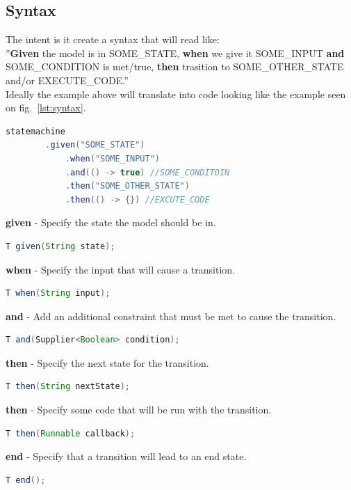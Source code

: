 \documentclass{article}
\begin{document}
\subsection{Syntax}

The intent is it create a syntax that will read like:\\
''\textbf{Given} the model is in SOME\_STATE, \textbf{when} we give it SOME\_INPUT \textbf{and} SOME\_CONDITION is met/true, \textbf{then} trasition to SOME\_OTHER\_STATE  and/or EXECUTE\_CODE.''\\

\noindent Ideally the example above will translate into code looking like the example seen on fig.~\ref{lst:syntax}.
\begin{lstlisting}[language=java, caption={Example of Intented API Usage}, captionpos=b, label={lst:syntax}]
    statemachine
        .given("SOME_STATE")
            .when("SOME_INPUT")
            .and(() -> true) //SOME_CONDITOIN
            .then("SOME_OTHER_STATE")
            .then(() -> {}) //EXCUTE_CODE
\end{lstlisting}

\textbf{given} - Specify the state the model should be in.
\begin{lstlisting}[language=java]
    T given(String state);
\end{lstlisting}

\textbf{when} - Specify the input that will cause a transition.
\begin{lstlisting}[language=java]
    T when(String input);
\end{lstlisting}

\textbf{and} - Add an additional constraint that must be met to cause the transition.
\begin{lstlisting}[language=java]
    T and(Supplier<Boolean> condition);
\end{lstlisting}

\textbf{then} - Specify the next state for the transition.
\begin{lstlisting}[language=java]
    T then(String nextState);
\end{lstlisting}

\textbf{then} - Specify some code that will be run with the transition.
\begin{lstlisting}[language=java]
    T then(Runnable callback);
\end{lstlisting}

\textbf{end} - Specify that a transition will lead to an end state.
\begin{lstlisting}[language=java]
    T end();
\end{lstlisting}
\end{document}
